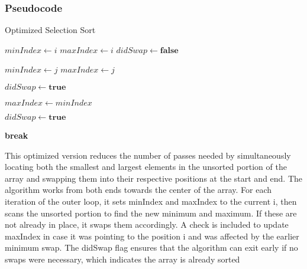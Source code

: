 \subsubsection{Pseudocode}
\begin{algorithm}
\caption{Optimized Selection Sort}
\begin{algorithmic}[1]
        \State $minIndex \gets i$
        \State $maxIndex \gets i$
        \State $didSwap \gets \textbf{false}$
        
                \State $minIndex \gets j$
            \EndIf
                \State $maxIndex \gets j$
            \EndIf
        \EndFor

            \State {}
            \State $didSwap \gets \textbf{true}$
        \EndIf

            \State $maxIndex \gets minIndex$
        \EndIf

            \State {}
            \State $didSwap \gets \textbf{true}$
        \EndIf

            \State \textbf{break}
        \EndIf
    \EndFor
\EndProcedure
\end{algorithmic}
\end{algorithm}
This optimized version reduces the number of passes needed by simultaneously locating both the smallest and largest elements in the unsorted portion of the array and swapping them into their respective positions at the start and end. The algorithm works from both ends towards the center of the array. For each iteration of the outer loop, it sets minIndex and maxIndex to the current i, then scans the unsorted portion to find the new minimum and maximum. If these are not already in place, it swaps them accordingly. A check is included to update maxIndex in case it was pointing to the position i and was affected by the earlier minimum swap. The didSwap flag ensures that the algorithm can exit early if no swaps were necessary, which indicates the array is already sorted